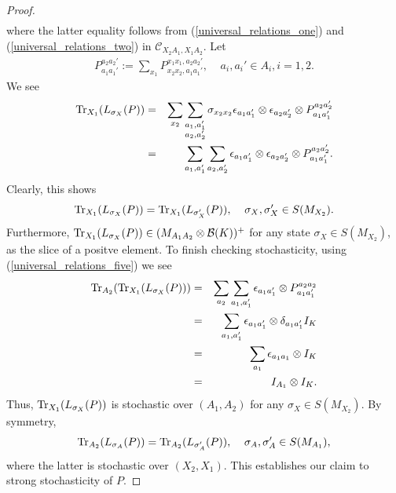 \documentclass[11pt]{amsart}
\newcommand{\cl}[1]{\mathcal{#1}}
\begin{document}
\begin{proof}
\begin{eqnarray*}
\end{eqnarray*}
\noindent where the latter equality follows from (\ref{universal_relations_one}) and (\ref{universal_relations_two}) in $\cl{C}_{X_{2}A_{1}, X_{1}A_{2}}$. Let
\begin{gather*}
	P_{a_{1}a_{1}'}^{a_{2}a_{2}'} := \sum\limits_{x_{1}}P_{x_{2}x_{2}, a_{1}a_{1}'}^{x_{1}x_{1}, a_{2}a_{2}'}, \;\;\;\; a_{i}, a_{i}' \in A_{i}, i= 1, 2.
\end{gather*}
\noindent We see
\begin{eqnarray*}
{\rm Tr}_{X_{1}}(L_{\sigma_{X}}(P))
& = &
\sum\limits_{x_{2}}\sum\limits_{\substack{a_{1}, a_{1}' \\ a_{2}, a_{2}'}}\sigma_{x_{2}x_{2}}\epsilon_{a_{1}a_{1}'}\otimes \epsilon_{a_{2}a_{2}'}\otimes P_{a_{1}a_{1}'}^{a_{2}a_{2}'}
\\
& = &
\sum\limits_{a_{1}, a_{1}'}\sum\limits_{a_{2}, a_{2}'}\epsilon_{a_{1}a_{1}'}\otimes \epsilon_{a_{2}a_{2}'}\otimes P_{a_{1}a_{1}'}^{a_{2}a_{2}'}.
\end{eqnarray*}
\noindent Clearly, this shows
\begin{gather*}
	{\rm Tr}_{X_{1}}(L_{\sigma_{X}}(P)) = {\rm Tr}_{X_{1}}(L_{\sigma_{X}'}(P)), \;\;\;\; \sigma_{X}, \sigma_{X}' \in S(M_{X_{2}}).
\end{gather*}
\noindent Furthermore, ${\rm Tr}_{X_{1}}(L_{\sigma_{X}}(P)) \in (M_{A_{1}A_{2}}\otimes \cl{B}(K))^{+}$ for any state $\sigma_{X} \in S(M_{X_{2}})$, as the slice of a positve element. To finish checking stochasticity, using (\ref{universal_relations_five}) we see
\begin{eqnarray*}
{\rm Tr}_{A_{2}}({\rm Tr}_{X_{1}}(L_{\sigma_{X}}(P)))
& = &
\sum\limits_{a_{2}}\sum\limits_{a_{1}, a_{1}'}\epsilon_{a_{1}a_{1}'}\otimes P_{a_{1}a_{1}'}^{a_{2}a_{2}} \\
& = &
\sum\limits_{a_{1}, a_{1}'}\epsilon_{a_{1}a_{1}'}\otimes \delta_{a_{1}a_{1}'}I_{K} \\
& = &
\sum\limits_{a_{1}}\epsilon_{a_{1}a_{1}}\otimes I_{K} \\
& = &
I_{A_{1}}\otimes I_{K}.
\end{eqnarray*}
\noindent Thus, ${\rm Tr}_{X_{1}}(L_{\sigma_{X}}(P))$ is stochastic over $(A_{1}, A_{2})$ for any $\sigma_{X} \in S(M_{X_{2}})$. By symmetry, 
\begin{gather*}
	{\rm Tr}_{A_{2}}(L_{\sigma_{A}}(P)) = {\rm Tr}_{A_{2}}(L_{\sigma_{A}'}(P)), \;\;\;\; \sigma_{A}, \sigma_{A}' \in S(M_{A_{1}}),
\end{gather*}
where the latter is stochastic over $(X_{2}, X_{1})$. This establishes our claim to strong stochasticity of $P$. 


\end{proof}
\end{document}
